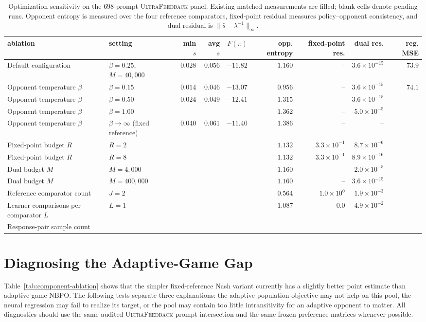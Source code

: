 \documentclass{article}
\theoremstyle{remark}
\theoremstyle{plain}
\newcommand{\NBPO}{\textsc{NBPO}}
\begin{document}
\begin{table}[t]
\centering\scriptsize
\setlength{\tabcolsep}{3.0pt}
\caption{Optimization sensitivity on the $698$-prompt \textsc{UltraFeedback} panel. Existing matched measurements are filled; blank cells denote pending runs. Opponent entropy is measured over the four reference comparators, fixed-point residual measures policy--opponent consistency, and dual residual is $\|\widehat s-\lambda^{-1}\|_\infty$.}
\label{tab:optimization-ablation}
\begin{tabular}{llrrrrrrr}
\toprule
ablation & setting & min $s$ & avg $s$ & $F(\pi)$ & opp. entropy & fixed-point res. & dual res. & reg. MSE \\
\midrule
Default configuration & $\beta=0.25$, $M=40{,}000$ & $0.028$ & $0.056$ & $-11.82$ & $1.160$ & -- & $3.6\times10^{-15}$ & $73.9$ \\
Opponent temperature $\beta$ & $\beta=0.15$ & $0.014$ & $0.046$ & $-13.07$ & $0.956$ & -- & $3.6\times10^{-15}$ & $74.1$ \\
Opponent temperature $\beta$ & $\beta=0.50$ & $0.024$ & $0.049$ & $-12.41$ & $1.315$ & -- & $3.6\times10^{-15}$ & \\
Opponent temperature $\beta$ & $\beta=1.00$ & & & & $1.362$ & -- & $5.0\times10^{-5}$ & \\
Opponent temperature $\beta$ & $\beta\to\infty$ (fixed reference) & $0.040$ & $0.061$ & $-11.40$ & $1.386$ & -- & -- & \\
Fixed-point budget $R$ & $R=2$ & & & & $1.132$ & $3.3\times10^{-1}$ & $8.7\times10^{-6}$ & \\
Fixed-point budget $R$ & $R=8$ & & & & $1.132$ & $3.3\times10^{-1}$ & $8.9\times10^{-16}$ & \\
Dual budget $M$ & $M=4{,}000$ & & & & $1.160$ & -- & $2.0\times10^{-5}$ & \\
Dual budget $M$ & $M=400{,}000$ & & & & $1.160$ & -- & $3.6\times10^{-15}$ & \\
Reference comparator count & $J=2$ & & & & $0.564$ & $1.0\times10^{0}$ & $1.9\times10^{-3}$ & \\
Learner comparisons per comparator $L$ & $L=1$ & & & & $1.087$ & $0.0$ & $4.9\times10^{-2}$ & \\
Response-pair sample count & & & & & & & & \\
\bottomrule
\end{tabular}
\end{table}


\section{Diagnosing the Adaptive-Game Gap}
\label{app:representation-diagnostics}
Table~\ref{tab:component-ablation} shows that the simpler fixed-reference Nash
variant currently has a slightly better point estimate than adaptive-game
\NBPO{}. The following tests separate three explanations: the adaptive
population objective may not help on this pool, the neural regression may fail
to realize its target, or the pool may contain too little intransitivity for an
adaptive opponent to matter. All diagnostics should use the same audited
\textsc{UltraFeedback} prompt intersection and the same frozen preference
matrices whenever possible.
\end{document}
